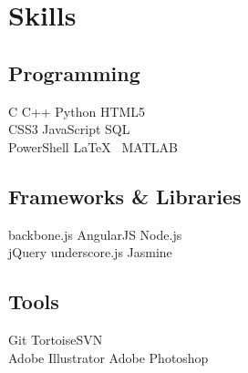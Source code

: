 \documentclass[letterpaper]{deedy-resume} %
\begin{document}


\begin{minipage}[t]{0.32\textwidth} %

\section{Skills}

\subsection{Programming}

C \textbullet{} C++ \textbullet{} Python \textbullet{} HTML5 \\
CSS3 \textbullet{} JavaScript \textbullet{} SQL\\
PowerShell \textbullet{} \LaTeX\ \textbullet{} MATLAB \\

\sectionspace %

\subsection{Frameworks \& Libraries}
backbone.js \textbullet{} AngularJS  \textbullet{} Node.js\\
jQuery \textbullet{} underscore.js \textbullet{} Jasmine\\
 
\sectionspace %
\subsection{Tools}
Git  \textbullet{} TortoiseSVN  \\
Adobe Illustrator \textbullet{} Adobe Photoshop \\

\sectionspace %

\end{minipage}
\end{document}
